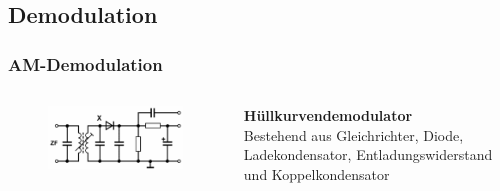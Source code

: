 \subsection{Demodulation}

\begin{frame}
  \frametitle{AM-Demodulation}

  \begin{columns}
    \begin{figure}
      \includegraphics[width=\textwidth,height=\textheight,keepaspectratio]{a12/td503.png}
    \end{figure}
    \textbf{Hüllkurvendemodulator}\\[.5em]
    Bestehend aus Gleichrichter, Diode, Ladekondensator, Entladungswiderstand und Koppelkondensator
  \end{columns}
\end{frame}

